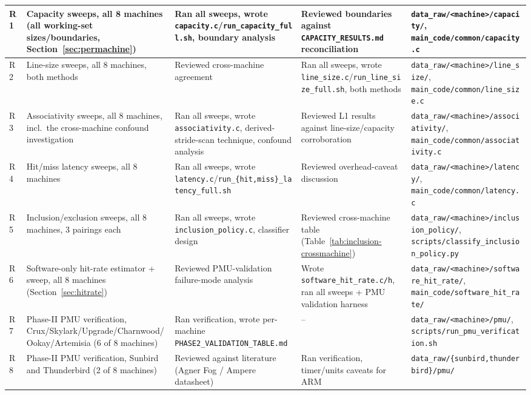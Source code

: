 \documentclass{article}
\begin{document}
\begin{longtable}{|p{1.2cm}|p{4cm}|p{2.5cm}|p{2.5cm}|p{3cm}|}
R1 & Capacity sweeps, all 8 machines (all working-set sizes/boundaries, Section~\ref{sec:permachine}) & Ran all sweeps, wrote \texttt{capacity.c}/\texttt{run\_capacity\_full.sh}, boundary analysis & Reviewed boundaries against \texttt{CAPACITY\_RESULTS.md} reconciliation & \texttt{data\_raw/<machine>/capacity/}, \texttt{main\_code/common/capacity.c}\\
\hline
R2 & Line-size sweeps, all 8 machines, both methods & Reviewed cross-machine agreement & Ran all sweeps, wrote \texttt{line\_size.c}/\texttt{run\_line\_size\_full.sh}, both methods & \texttt{data\_raw/<machine>/line\_size/}, \texttt{main\_code/common/line\_size.c}\\
\hline
R3 & Associativity sweeps, all 8 machines, incl.\ the cross-machine confound investigation & Ran all sweeps, wrote \texttt{associativity.c}, derived-stride-scan technique, confound analysis & Reviewed L1 results against line-size/capacity corroboration & \texttt{data\_raw/<machine>/associativity/}, \texttt{main\_code/common/associativity.c}\\
\hline
R4 & Hit/miss latency sweeps, all 8 machines & Ran all sweeps, wrote \texttt{latency.c}/\texttt{run\_\{hit,miss\}\_latency\_full.sh} & Reviewed overhead-caveat discussion & \texttt{data\_raw/<machine>/latency/}, \texttt{main\_code/common/latency.c}\\
\hline
R5 & Inclusion/exclusion sweeps, all 8 machines, 3 pairings each & Ran all sweeps, wrote \texttt{inclusion\_policy.c}, classifier design & Reviewed cross-machine table (Table~\ref{tab:inclusion-crossmachine}) & \texttt{data\_raw/<machine>/inclusion\_policy/}, \texttt{scripts/classify\_inclusion\_policy.py}\\
\hline
R6 & Software-only hit-rate estimator + sweep, all 8 machines (Section~\ref{sec:hitrate}) & Reviewed PMU-validation failure-mode analysis & Wrote \texttt{software\_hit\_rate.c/h}, ran all sweeps + PMU validation harness & \texttt{data\_raw/<machine>/software\_hit\_rate/}, \texttt{main\_code/software\_hit\_rate/}\\
\hline
R7 & Phase-II PMU verification, Crux/Skylark/Upgrade/Charnwood/Ookay/Artemisia (6 of 8 machines) & Ran verification, wrote per-machine \texttt{PHASE2\_VALIDATION\_TABLE.md} & -- & \texttt{data\_raw/<machine>/pmu/}, \texttt{scripts/run\_pmu\_verification.sh}\\
\hline
R8 & Phase-II PMU verification, Sunbird and Thunderbird (2 of 8 machines) & Reviewed against literature (Agner Fog / Ampere datasheet) & Ran verification, timer/units caveats for ARM & \texttt{data\_raw/\{sunbird,thunderbird\}/pmu/}\\

\end{longtable}
\end{document}
